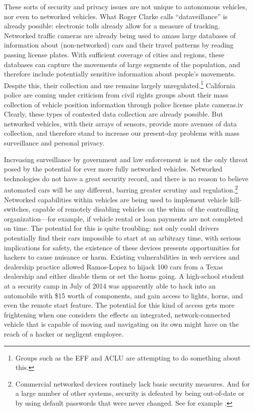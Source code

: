 These sorts of security and privacy issues are not unique to
autonomous vehicles, nor even to networked vehicles. What Roger Clarke
calls ``dataveillance'' is already possible: electronic tolls already
allow for a measure of tracking.\cite[p. 25]{nissenbaum} Networked traffic cameras are
already being used to amass large databases of information about
(non-networked) cars and their travel patterns by reading passing
license plates.\cite[p. 26]{nissenbaum} With sufficient coverage of cities and regions,
these databases can capture the movements of large segments of the
population, and therefore include potentially sensitive information
about people's movements. Despite this, their collection and use
remains largely unregulated.\footnote{Groups such as the EFF and ACLU
  are attempting to do something about this.\cite{kayyaliEFF}} California police are coming under
criticism from civil rights groups about their mass collection of
vehicle position information through police license plate cameras.iv
Clearly, these types of contested data collection are already
possible. But networked vehicles, with their arrays of sensors,
provide more avenues of data collection, and therefore stand to
increase our present-day problems with mass surveillance and personal
privacy.

Increasing surveillance by government and law enforcement is not the
only threat posed by the potential for ever more fully networked
vehicles. Networked technologies do not have a great security record,
and there is no reason to believe automated cars will be any
different, barring greater scrutiny and
regulation.\footnote{Commercial networked devices routinely lack basic
security measures. And for a large number of other systems, security
is defeated by being out-of-date or by using default passwords that
were never changed. See for example \cite{zetter}.}
Networked capabilities within vehicles are being used to
implement vehicle kill-switches, capable of remotely disabling
vehicles on the whim of the controlling organization---for example, if
vehicle rental or loan payments are not completed on time. The
potential for this is quite troubling: not only could drivers
potentially find their cars impossible to start at an arbitrary time,
with serious implications for safety, the existence of these devices
presents opportunities for hackers to cause nuisance or
harm.\cite{goodman}
Existing vulnerabilities in web services and dealership practice
allowed Ramos-Lopez to hijack 100 cars from a Texas dealership and
either disable them or set
the horns
going.\cite{poulsenHacker} A
high-school student at a security camp in July of 2014 was apparently
able to hack into an automobile with \$15 worth of components, and
gain access to lights, horns, and even the remote start
feature.\cite{bigelow14}
The
potential for this kind of access gets more frightening when one
considers the effects an integrated, network-connected vehicle that is capable of
moving and navigating on its own might have on the reach of a hacker or negligent employee.

